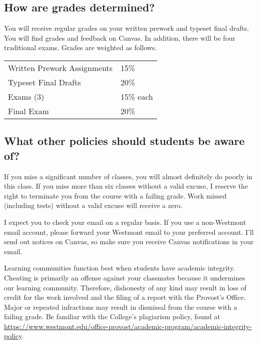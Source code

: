 \documentclass[
  twoside]{article}
\begin{document}
\hypertarget{how-are-grades-determined}{%
\subsection{How are grades
determined?}\label{how-are-grades-determined}}

You will receive regular grades on your written prework and typeset
final drafts. You will find grades and feedback on Canvas. In addition,
there will be four traditional exams. Grades are weighted as follows.

\begin{tabular}[t]{ll}
\toprule
Written Prework Assignments & 15\%\\
Typeset Final Drafts & 20\%\\
Exams (3) & 15\% each\\
Final Exam & 20\%\\
\bottomrule
\end{tabular}

\hypertarget{what-other-policies-should-students-be-aware-of}{%
\subsection{What other policies should students be aware
of?}\label{what-other-policies-should-students-be-aware-of}}

If you miss a significant number of classes, you will almost definitely
do poorly in this class. If you miss more than six classes without a
valid excuse, I reserve the right to terminate you from the course with
a failing grade. Work missed (including tests) without a valid excuse
will receive a zero.

I expect you to check your email on a regular basis. If you use a
non-Westmont email account, please forward your Westmont email to your
preferred account. I'll send out notices on Canvas, so make sure you
receive Canvas notifications in your email.

Learning communities function best when students have academic
integrity. Cheating is primarily an offense against your classmates
because it undermines our learning community. Therefore, dishonesty of
any kind may result in loss of credit for the work involved and the
filing of a report with the Provost's Office. Major or repeated
infractions may result in dismissal from the course with a failing
grade. Be familiar with the College's plagiarism policy, found at
\url{https://www.westmont.edu/office-provost/academic-program/academic-integrity-policy}.
\end{document}
